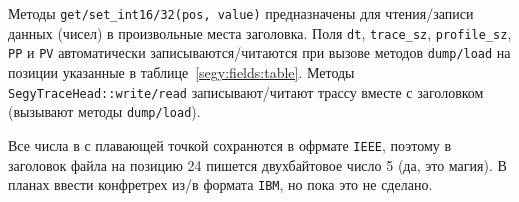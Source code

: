 Методы \verb'get/set_int16/32(pos, value)' предназначены для чтения/записи данных (чисел) в произвольные места заголовка.
Поля  \verb'dt', \verb'trace_sz',
\verb'profile_sz', \verb'PP' и \verb'PV' автоматически записываются/читаются при вызове методов \verb'dump/load' на позиции указанные в таблице~\ref{segy:fields:table}.
Методы \verb'SegyTraceHead::write/read' записывают/читают трассу вместе с заголовком (вызывают методы \verb'dump/load').

Все числа в с плавающей точкой сохранются в офрмате \verb'IEEE', поэтому в заголовок файла на позицию 24 пишется двухбайтовое число 5 (да, это магия).
В планах ввести конфретрех из/в формата \verb'IBM', но пока это не сделано. 
